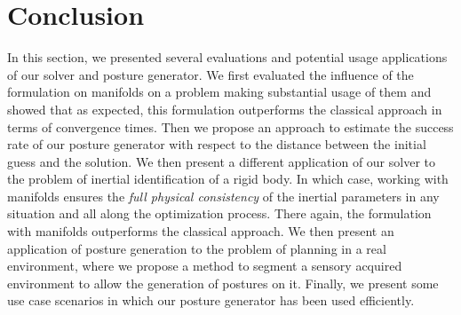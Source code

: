 \section{Conclusion}
\label{sec:conclusion_chap_6}

In this section, we presented several evaluations and potential usage applications of our solver and posture generator.
We first evaluated the influence of the formulation on manifolds on a problem making substantial usage of them and showed that as expected, this formulation outperforms the classical approach in terms of convergence times.
Then we propose an approach to estimate the success rate of our posture generator with respect to the distance between the initial guess and the solution.
We then present a different application of our solver to the problem of inertial identification of a rigid body.
In which case, working with manifolds ensures the \emph{full physical consistency} of the inertial parameters in any situation and all along the optimization process.
There again, the formulation with manifolds outperforms the classical approach.
We then present an application of posture generation to the problem of planning in a real environment, where we propose a method to segment a sensory acquired environment to allow the generation of postures on it.
Finally, we present some use case scenarios in which our posture generator has been used efficiently.
